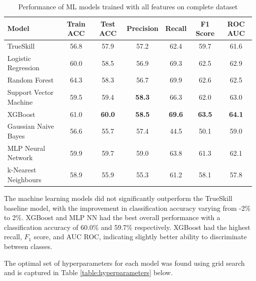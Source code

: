 \begin{table}[h!]
	\centering
	\small
	\begin{adjustbox}{center} %
		\begin{tabular}{ |l|c|c|c|c|c|c| }
			\hline
			\rule{0pt}{2.6ex} \textbf{Model} & \textbf{Train ACC} & \textbf{Test ACC} & \textbf{Precision} & \textbf{Recall} & \textbf{F1 Score} & \textbf{ROC AUC} \\
			\hline
			\rule{0pt}{2.6ex} TrueSkill                 & 56.8 & 57.9 & 57.2 & 62.4 & 59.7 & 61.6 \\ \hline
			\rule{0pt}{2.6ex} Logistic Regression 		& 60.0 & 58.5 & 56.9 & 69.3 & 62.5 & 62.9 \\
			\rule{0pt}{2.6ex} Random Forest 			& 64.3 & 58.3 & 56.7 & 69.9 & 62.6 & 62.5 \\
			\rule{0pt}{2.6ex} Support Vector Machine 	& 59.5 & 59.4 & \textbf{58.3} & 66.3 & 62.0 & 63.0 \\
			\rule{0pt}{2.6ex} XGBoost 					& 61.0 & \textbf{60.0} & \textbf{58.5} &\textbf{ 69.6} & \textbf{63.5} & \textbf{64.1} \\
			\rule{0pt}{2.6ex} Gaussian Naive Bayes 		& 56.6 & 55.7 & 57.4 & 44.5 & 50.1 & 59.0 \\
			\rule{0pt}{2.6ex} MLP Neural Network 		& 59.9 & 59.7 & 59.0 & 63.8 & 61.3 & 62.1 \\
			\rule{0pt}{2.6ex} k-Nearest Neighbours 		& 58.9 & 55.9 & 55.3 & 61.2 & 58.1 & 57.8 \\
			\hline
		\end{tabular}
	\end{adjustbox}
	\caption{Performance of ML models trained with all features on complete dataset}
	\label{table:1}
\end{table}

The machine learning models did not significantly outperform the TrueSkill baseline model, with the improvement in classification accuracy varying from -2\% to 2\%. XGBoost and MLP NN had the best overall performance with a classification accuracy of 60.0\% and 59.7\%  respectively. XGBoost had the highest recall, $F_1$ score, and AUC ROC, indicating slightly better ability to discriminate between classes.

The optimal set of hyperparameters for each model was found using grid search and is captured in Table \ref{table:hyperparameters} below.

